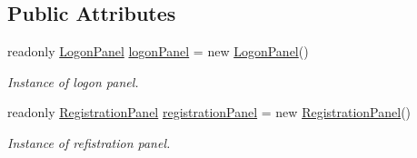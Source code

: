 \subsection*{Public Attributes}
\begin{DoxyCompactItemize}
\item 
readonly \mbox{\hyperlink{class_wpf_handler_1_1_u_i_1_1_controls_1_1_logon_1_1_logon_panel}{Logon\+Panel}} \mbox{\hyperlink{class_wpf_handler_1_1_u_i_1_1_controls_1_1_logon_1_1_logon_screen_a410f16aabbf34281eb778da292be0966}{logon\+Panel}} = new \mbox{\hyperlink{class_wpf_handler_1_1_u_i_1_1_controls_1_1_logon_1_1_logon_panel}{Logon\+Panel}}()
\begin{DoxyCompactList}\small\item\em Instance of logon panel. \end{DoxyCompactList}\item 
readonly \mbox{\hyperlink{class_wpf_handler_1_1_u_i_1_1_controls_1_1_logon_1_1_registration_panel}{Registration\+Panel}} \mbox{\hyperlink{class_wpf_handler_1_1_u_i_1_1_controls_1_1_logon_1_1_logon_screen_a9de43de9ee6526493d97226d75385262}{registration\+Panel}} = new \mbox{\hyperlink{class_wpf_handler_1_1_u_i_1_1_controls_1_1_logon_1_1_registration_panel}{Registration\+Panel}}()
\begin{DoxyCompactList}\small\item\em Instance of refistration panel. \end{DoxyCompactList}\end{DoxyCompactItemize}

